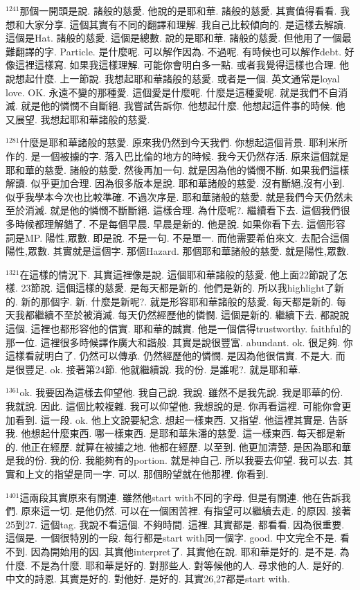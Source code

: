 \documentclass{book}
\begin{document}
$^{1241}$那個一開頭是說.
諸般的慈愛.
他說的是耶和華.
諸般的慈愛.
其實值得看看.
我想和大家分享.
這個其實有不同的翻譯和理解.
我自己比較傾向的.
是這樣去解讀.
這個是Hat.
諸般的慈愛.
這個是總數.
說的是耶和華.
諸般的慈愛.
但他用了一個最難翻譯的字.
Particle.
是什麼呢.
可以解作因為.
不過呢.
有時候也可以解作debt.
好像這裡這樣寫.
如果我這樣理解.
可能你會明白多一點.
或者我覺得這樣也合理.
他說想起什麼.
上一節說.
我想起耶和華諸般的慈愛.
或者是一個.
英文通常是loyal love.
OK.
永遠不變的那種愛.
這個愛是什麼呢.
什麼是這種愛呢.
就是我們不自消滅.
就是他的憐憫不自斷絕.
我嘗試告訴你.
他想起什麼.
他想起這件事的時候.
他又展望.
我想起耶和華諸般的慈愛.

$^{1281}$什麼是耶和華諸般的慈愛.
原來我仍然到今天我們.
你想起這個背景.
耶利米所作的.
是一個被擄的字.
落入巴比倫的地方的時候.
我今天仍然存活.
原來這個就是耶和華的慈愛.
諸般的慈愛.
然後再加一句.
就是因為他的憐憫不斷.
如果我們這樣解讀.
似乎更加合理.
因為很多版本是說.
耶和華諸般的慈愛.
沒有斷絕,沒有小到.
似乎我學本今次也比較準確.
不過次序是.
耶和華諸般的慈愛.
就是我們今天仍然未至於消滅.
就是他的憐憫不斷斷絕.
這樣合理.
為什麼呢?.
繼續看下去.
這個我們很多時候都理解錯了.
不是每個早晨.
早晨是新的.
他是說.
如果你看下去.
這個形容詞是MP.
陽性,眾數.
即是說.
不是一句.
不是單一.
而他需要希伯來文.
去配合這個陽性,眾數.
其實就是這個字.
那個Hazard.
那個耶和華諸般的慈愛.
就是陽性,眾數.

$^{1321}$在這樣的情況下.
其實這裡像是說.
這個耶和華諸般的慈愛.
他上面22節說了怎樣.
23節說.
這個這樣的慈愛.
是每天都是新的.
他們是新的.
所以我highlight了新的.
新的那個字.
新.
什麼是新呢?.
就是形容耶和華諸般的慈愛.
每天都是新的.
每天我都繼續不至於被消滅.
每天仍然經歷他的憐憫.
這個是新的.
繼續下去.
都說說這個.
這裡也都形容他的信實.
耶和華的誠實.
他是一個信得trustworthy.
faithful的那一位.
這裡很多時候譯作廣大和諧般.
其實是說很豐富.
abundant.
ok.
很足夠.
你這樣看就明白了.
仍然可以傳承.
仍然經歷他的憐憫.
是因為他很信實.
不是大.
而是很豐足.
ok.
接著第24節.
他就繼續說.
我的份.
是誰呢?.
就是耶和華.

$^{1361}$ok.
我要因為這樣去仰望他.
我自己說.
我說.
雖然不是我先說.
我是耶華的份.
我就說.
因此.
這個比較複雜.
我可以仰望他.
我想說的是.
你再看這裡.
可能你會更加看到.
這一段.
ok.
他上文說要紀念.
想起一樣東西.
又指望.
他這裡其實是.
告訴我.
他想起什麼東西.
哪一樣東西.
是耶和華朱潘的慈愛.
這一樣東西.
每天都是新的.
他正在經歷.
就算在被擄之地.
他都在經歷.
以至到.
他更加清楚.
是因為耶和華是我的份.
我的份.
我能夠有的portion.
就是神自己.
所以我要去仰望.
我可以去.
其實和上文的指望是同一字.
可以.
那個盼望就在他那裡.
你看到.

$^{1401}$這兩段其實原來有關連.
雖然他start with不同的字母.
但是有關連.
他在告訴我們.
原來這一切.
是他仍然.
可以在一個困苦裡.
有指望可以繼續去走.
的原因.
接著25到27.
這個tag.
我說不看這個.
不夠時間.
這裡.
其實都是.
都看看.
因為很重要.
這個是.
一個很特別的一段.
每行都是start with同一個字.
good.
中文完全不是.
看不到.
因為開始用的因.
其實他interpret了.
其實他在說.
耶和華是好的.
是不是.
為什麼.
不是為什麼.
耶和華是好的.
對那些人.
對等候他的人.
尋求他的人.
是好的.
中文的詩恩.
其實是好的.
對他好.
是好的.
其實26,27都是start with.
\end{document}
